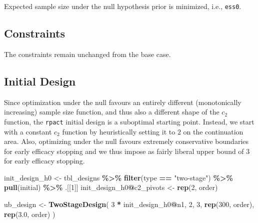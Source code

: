 \documentclass[
]{book}
\newenvironment{Shaded}{\begin{snugshade}}{\end{snugshade}}
\newcommand{\DecValTok}[1]{\textcolor[rgb]{0.00,0.00,0.81}{#1}}
\newcommand{\FloatTok}[1]{\textcolor[rgb]{0.00,0.00,0.81}{#1}}
\newcommand{\KeywordTok}[1]{\textcolor[rgb]{0.13,0.29,0.53}{\textbf{#1}}}
\newcommand{\NormalTok}[1]{#1}
\newcommand{\OperatorTok}[1]{\textcolor[rgb]{0.81,0.36,0.00}{\textbf{#1}}}
\newcommand{\StringTok}[1]{\textcolor[rgb]{0.31,0.60,0.02}{#1}}
\begin{document}
Expected sample size under the null hypothesis prior is minimized,
i.e., \texttt{ess0}.

\hypertarget{constraints-1}{%
\subsection{Constraints}\label{constraints-1}}

The constraints remain unchanged from the base case.

\hypertarget{initial-design}{%
\subsection{Initial Design}\label{initial-design}}

Since optimization under the null favours an entirely different
(monotonically increasing) sample size function,
and thus also a different shape of the \(c_2\) function,
the \texttt{rpact} initial design is a suboptimal starting point.
Instead, we start with a constant \(c_2\) function by heuristically
setting it to \(2\) on the continuation area.
Also, optimizing under the null favours extremely conservative
boundaries for early efficacy stopping and we thus impose as fairly
liberal upper bound of \(3\) for early efficacy stopping.

\begin{Shaded}
\begin{Highlighting}[]
\NormalTok{init\_design\_h0 \textless{}{-}}\StringTok{ }\NormalTok{tbl\_designs }\OperatorTok{\%\textgreater{}\%}\StringTok{ }
\StringTok{    }\KeywordTok{filter}\NormalTok{(type }\OperatorTok{==}\StringTok{ "two{-}stage"}\NormalTok{) }\OperatorTok{\%\textgreater{}\%}\StringTok{ }
\StringTok{    }\KeywordTok{pull}\NormalTok{(initial) }\OperatorTok{\%\textgreater{}\%}\StringTok{ }
\StringTok{    }\NormalTok{.[[}\DecValTok{1}\NormalTok{]]}
\NormalTok{init\_design\_h0}\OperatorTok{@}\NormalTok{c2\_pivots \textless{}{-}}\StringTok{ }\KeywordTok{rep}\NormalTok{(}\DecValTok{2}\NormalTok{, order)}

\NormalTok{ub\_design \textless{}{-}}\StringTok{ }\KeywordTok{TwoStageDesign}\NormalTok{(}
    \DecValTok{3} \OperatorTok{*}\StringTok{ }\NormalTok{init\_design\_h0}\OperatorTok{@}\NormalTok{n1,}
    \DecValTok{2}\NormalTok{,}
    \DecValTok{3}\NormalTok{,}
    \KeywordTok{rep}\NormalTok{(}\DecValTok{300}\NormalTok{, order),}
    \KeywordTok{rep}\NormalTok{(}\FloatTok{3.0}\NormalTok{, order)}
\NormalTok{)}
\end{Highlighting}
\end{Shaded}
\end{document}
